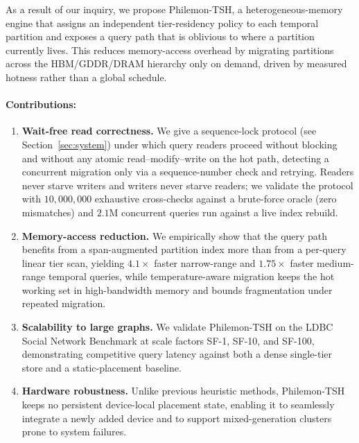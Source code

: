 \documentclass{article}
\begin{document}
As a result of our inquiry, we propose Philemon-TSH, a heterogeneous-memory engine
that assigns an independent tier-residency policy to each temporal partition and
exposes a query path that is oblivious to where a partition currently lives. This
reduces memory-access overhead by migrating partitions across the HBM/GDDR/DRAM
hierarchy only on demand, driven by measured hotness rather than a global schedule.

\paragraph{Contributions:}
\begin{enumerate}
    \item \textbf{Wait-free read correctness.} We give a sequence-lock protocol
    (see Section~\ref{sec:system}) under which query readers proceed without blocking
    and without any atomic read--modify--write on the hot path, detecting a concurrent
    migration only via a sequence-number check and retrying. Readers never starve
    writers and writers never starve readers; we validate the protocol with
    $10{,}000{,}000$ exhaustive cross-checks against a brute-force oracle (zero
    mismatches) and $2.1$M concurrent queries run against a live index rebuild.

    \item \textbf{Memory-access reduction.} We empirically show that the query path
    benefits from a span-augmented partition index more than from a per-query linear
    tier scan, yielding $4.1\times$ faster narrow-range and $1.75\times$ faster
    medium-range temporal queries, while temperature-aware migration keeps the hot
    working set in high-bandwidth memory and bounds fragmentation under repeated
    migration.

    \item \textbf{Scalability to large graphs.} We validate Philemon-TSH on the LDBC
    Social Network Benchmark at scale factors SF-1, SF-10, and SF-100, demonstrating
    competitive query latency against both a dense single-tier store and a
    static-placement baseline.

    \item \textbf{Hardware robustness.} Unlike previous heuristic methods,
    Philemon-TSH keeps no persistent device-local placement state, enabling it to
    seamlessly integrate a newly added device and to support mixed-generation clusters
    prone to system failures.
\end{enumerate}
\end{document}
